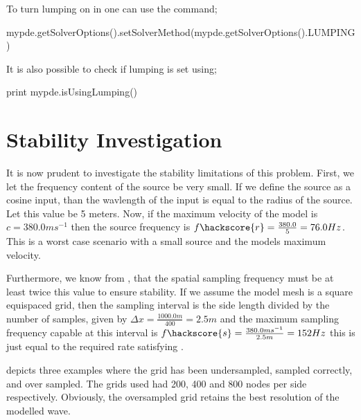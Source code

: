 To turn lumping on in \esc one can use the command;
\begin{python}
 mypde.getSolverOptions().setSolverMethod(mypde.getSolverOptions().LUMPING)
\end{python}
It is also possible to check if lumping is set using;
\begin{python}
  print mypde.isUsingLumping()
\end{python}

\section{Stability Investigation}
It is now prudent to investigate the stability limitations of this problem.
First, we let the frequency content of the source be very small. If we define
the source as a cosine input, than the wavlength of the input is equal to the
radius of the source. Let this value be 5 meters. Now, if the maximum velocity
of the model is $c=380.0ms^{-1}$ then the source
frequency is $f\hackscore{r} = \frac{380.0}{5} = 76.0 Hz$. This is a worst case
scenario with a small source and the models maximum velocity. 

Furthermore, we know from , that the spatial sampling
frequency must be at least twice this value to ensure stability. If we assume
the model mesh is a square equispaced grid,
then the sampling interval is the side length divided by the number of samples,
given by $\Delta x = \frac{1000.0m}{400} = 2.5m$ and the maximum sampling
frequency capable at this interval is
$f\hackscore{s}=\frac{380.0ms^{-1}}{2.5m}=152Hz$ this is just equal to the
required rate satisfying . 

 depicts three examples where the grid has been
undersampled, sampled correctly, and over sampled. The grids used had
200, 400 and 800 nodes per side respectively. Obviously, the oversampled grid
retains the best resolution of the modelled wave.

